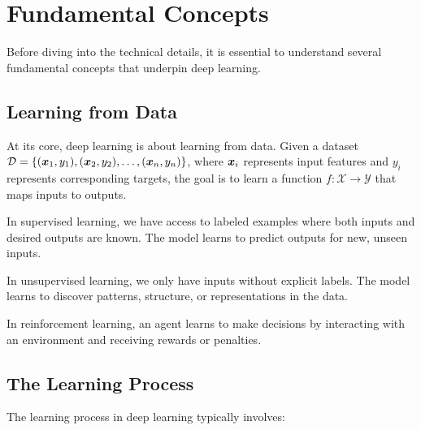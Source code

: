 
\section{Fundamental Concepts}
\label{sec:fundamental-concepts}

Before diving into the technical details, it is essential to understand several fundamental concepts that underpin deep learning.

\subsection{Learning from Data}

At its core, deep learning is about learning from data. Given a dataset $\mathcal{D} = \{(\boldsymbol{x}_1, y_1), (\boldsymbol{x}_2, y_2), \ldots, (\boldsymbol{x}_n, y_n)\}$, where $\boldsymbol{x}_i$ represents input features and $y_i$ represents corresponding targets, the goal is to learn a function $f: \mathcal{X} \rightarrow \mathcal{Y}$ that maps inputs to outputs.

\begin{definition}
In supervised learning, we have access to labeled examples where both inputs and desired outputs are known. The model learns to predict outputs for new, unseen inputs.
\end{definition}

\begin{definition}
In unsupervised learning, we only have inputs without explicit labels. The model learns to discover patterns, structure, or representations in the data.
\end{definition}

\begin{definition}
In reinforcement learning, an agent learns to make decisions by interacting with an environment and receiving rewards or penalties.
\end{definition}

\subsection{The Learning Process}

The learning process in deep learning typically involves:

